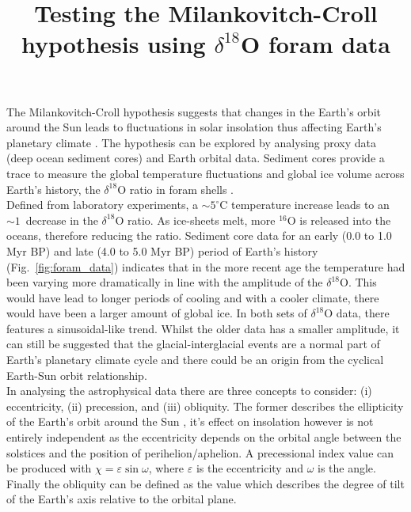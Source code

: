 \documentclass[12pt, onecolumn]{revtex4}    %
\begin{document}
                     

\title{Testing the Milankovitch-Croll hypothesis using $\delta^{18}$O foram data} 
\maketitle

\vspace{-4ex}

The Milankovitch-Croll hypothesis suggests that changes in the Earth's orbit around the Sun leads to fluctuations in solar insolation thus affecting Earth's planetary climate \cite{ruddiman_climate}. The hypothesis can be explored by analysing proxy data (deep ocean sediment cores) and Earth orbital data. Sediment cores provide a trace to measure the global temperature fluctuations and global ice volume across Earth's history, the $\delta^{18}$O ratio in foram shells \cite{droxler_climate}. \\


Defined from laboratory experiments, a $\sim 5^{\circ}\mathrm{C}$ temperature increase leads to an $\sim 1$\textperthousand\ decrease in the $\delta^{18}$O ratio. As ice-sheets melt, more $^{16}$O is released into the oceans, therefore reducing the ratio. Sediment core data for an early (0.0 to 1.0 Myr BP) and late (4.0 to 5.0 Myr BP) period of Earth's history (Fig.~\ref{fig:foram_data}) indicates that in the more recent age the temperature had been varying more dramatically in line with the amplitude of the $\delta^{18}$O. This would have lead to longer periods of cooling and with a cooler climate, there would have been a larger amount of global ice. In both sets of $\delta^{18}$O data, there features a sinusoidal-like trend. Whilst the older data has a smaller amplitude, it can still be suggested that the glacial-interglacial events are a normal part of Earth's planetary climate cycle and there could be an origin from the cyclical Earth-Sun orbit relationship. \\

In analysing the astrophysical data there are three concepts to consider: (i) eccentricity, (ii) precession, and (iii) obliquity. The former describes the ellipticity of the Earth's orbit around the Sun \cite{carroll_astro}, it's effect on insolation however is not entirely independent as the eccentricity depends on the orbital angle between the solstices and the position of perihelion/aphelion. A precessional index value can be produced with $\chi= \varepsilon \sin{\omega}$, where $\varepsilon$ is the eccentricity and $\omega$ is the angle. Finally the obliquity can be defined as the value which describes the degree of tilt of the Earth's axis relative to the orbital plane.  \\
\end{document}
